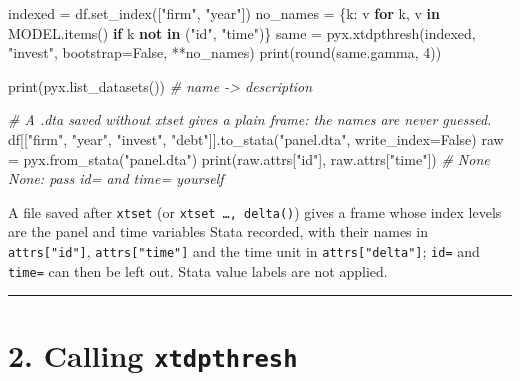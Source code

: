 \documentclass[
  10.5pt,
  a4paper,
]{article}
\newenvironment{Shaded}{}{}
\newcommand{\BuiltInTok}[1]{\textcolor[rgb]{0.00,0.50,0.00}{#1}}
\newcommand{\CommentTok}[1]{\textcolor[rgb]{0.38,0.63,0.69}{\textit{#1}}}
\newcommand{\ControlFlowTok}[1]{\textcolor[rgb]{0.00,0.44,0.13}{\textbf{#1}}}
\newcommand{\DecValTok}[1]{\textcolor[rgb]{0.25,0.63,0.44}{#1}}
\newcommand{\KeywordTok}[1]{\textcolor[rgb]{0.00,0.44,0.13}{\textbf{#1}}}
\newcommand{\NormalTok}[1]{#1}
\newcommand{\OperatorTok}[1]{\textcolor[rgb]{0.40,0.40,0.40}{#1}}
\newcommand{\StringTok}[1]{\textcolor[rgb]{0.25,0.44,0.63}{#1}}
\newcommand{\VariableTok}[1]{\textcolor[rgb]{0.10,0.09,0.49}{#1}}
\begin{document}
\begin{Shaded}
\begin{Highlighting}[]
\NormalTok{indexed }\OperatorTok{=}\NormalTok{ df.set\_index([}\StringTok{"firm"}\NormalTok{, }\StringTok{"year"}\NormalTok{])}
\NormalTok{no\_names }\OperatorTok{=}\NormalTok{ \{k: v }\ControlFlowTok{for}\NormalTok{ k, v }\KeywordTok{in}\NormalTok{ MODEL.items() }\ControlFlowTok{if}\NormalTok{ k }\KeywordTok{not} \KeywordTok{in}\NormalTok{ (}\StringTok{"id"}\NormalTok{, }\StringTok{"time"}\NormalTok{)\}}
\NormalTok{same }\OperatorTok{=}\NormalTok{ pyx.xtdpthresh(indexed, }\StringTok{"invest"}\NormalTok{, bootstrap}\OperatorTok{=}\VariableTok{False}\NormalTok{, }\OperatorTok{**}\NormalTok{no\_names)}
\BuiltInTok{print}\NormalTok{(}\BuiltInTok{round}\NormalTok{(same.gamma, }\DecValTok{4}\NormalTok{))}

\BuiltInTok{print}\NormalTok{(pyx.list\_datasets())  }\CommentTok{\# name {-}\textgreater{} description}

\CommentTok{\# A .dta saved without xtset gives a plain frame: the names are never guessed.}
\NormalTok{df[[}\StringTok{"firm"}\NormalTok{, }\StringTok{"year"}\NormalTok{, }\StringTok{"invest"}\NormalTok{, }\StringTok{"debt"}\NormalTok{]].to\_stata(}\StringTok{"panel.dta"}\NormalTok{, write\_index}\OperatorTok{=}\VariableTok{False}\NormalTok{)}
\NormalTok{raw }\OperatorTok{=}\NormalTok{ pyx.from\_stata(}\StringTok{"panel.dta"}\NormalTok{)}
\BuiltInTok{print}\NormalTok{(raw.attrs[}\StringTok{"id"}\NormalTok{], raw.attrs[}\StringTok{"time"}\NormalTok{])  }\CommentTok{\# None None: pass id= and time= yourself}
\end{Highlighting}
\end{Shaded}

A file saved after \texttt{xtset} (or \texttt{xtset\ …,\ delta()}) gives
a frame whose index levels are the panel and time variables Stata
recorded, with their names in \texttt{attrs{[}"id"{]}},
\texttt{attrs{[}"time"{]}} and the time unit in
\texttt{attrs{[}"delta"{]}}; \texttt{id=} and \texttt{time=} can then be
left out. Stata value labels are not applied.

\begin{center}\rule{0.5\linewidth}{0.5pt}\end{center}

\section{\texorpdfstring{2. Calling
\texttt{xtdpthresh}}{2. Calling xtdpthresh}}\label{calling-xtdpthresh}
\end{document}
